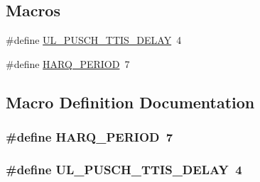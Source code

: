 \subsection*{Macros}
\begin{DoxyCompactItemize}
\item 
\#define \hyperlink{lte-common_8h_afbe3b423f9aed03e1ef065bf3753a6d4}{U\+L\+\_\+\+P\+U\+S\+C\+H\+\_\+\+T\+T\+I\+S\+\_\+\+D\+E\+L\+AY}~4
\item 
\#define \hyperlink{lte-common_8h_a275321ee206f130c3ddc81fcdaa13cfd}{H\+A\+R\+Q\+\_\+\+P\+E\+R\+I\+OD}~7
\end{DoxyCompactItemize}


\subsection{Macro Definition Documentation}
\subsubsection[{\texorpdfstring{H\+A\+R\+Q\+\_\+\+P\+E\+R\+I\+OD}{HARQ_PERIOD}}]{\setlength{\rightskip}{0pt plus 5cm}\#define H\+A\+R\+Q\+\_\+\+P\+E\+R\+I\+OD~7}\hypertarget{lte-common_8h_a275321ee206f130c3ddc81fcdaa13cfd}{}\label{lte-common_8h_a275321ee206f130c3ddc81fcdaa13cfd}
\subsubsection[{\texorpdfstring{U\+L\+\_\+\+P\+U\+S\+C\+H\+\_\+\+T\+T\+I\+S\+\_\+\+D\+E\+L\+AY}{UL_PUSCH_TTIS_DELAY}}]{\setlength{\rightskip}{0pt plus 5cm}\#define U\+L\+\_\+\+P\+U\+S\+C\+H\+\_\+\+T\+T\+I\+S\+\_\+\+D\+E\+L\+AY~4}\hypertarget{lte-common_8h_afbe3b423f9aed03e1ef065bf3753a6d4}{}\label{lte-common_8h_afbe3b423f9aed03e1ef065bf3753a6d4}
